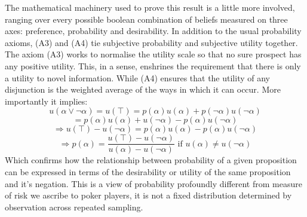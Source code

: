 \documentclass{tufte-handout}
\begin{document}
The mathematical machinery used to prove this result is a little more involved, ranging over every possible boolean combination of beliefs measured on three axes: preference, probability and desirability. In addition to the usual probability axioms, (A3) and (A4) tie subjective probability and subjective utility together. The axiom (A3) works to normalise the utility scale so that no sure prospect has any positive utility. This, in a sense, enshrines the requirement that there is only a utility to novel information. While (A4) ensures that the utility of any disjunction is the weighted average of the ways in which it can occur. More importantly it implies:
 $$u(\alpha \vee \neg\alpha) = u(\top) = p(\alpha)u(\alpha) + p(\neg\alpha)u(\neg\alpha)$$  
 $$= p(\alpha)u(\alpha) + u(\neg\alpha) - p(\alpha)u(\neg\alpha) $$
 $$ \Rightarrow u(\top) - u(\neg\alpha) = p(\alpha)u(\alpha)  - p(\alpha)u(\neg\alpha)$$
 $$ \Rightarrow p(\alpha) = \frac{u(\top) - u(\neg\alpha)}{ u(\alpha)  - u(\neg\alpha)} \text{  if } u(\alpha) \neq u(\neg\alpha) $$ 
Which confirms how the relationship between probability of a given proposition can be expressed in terms of the desirability or utility of the same proposition and it's negation. This is a view of probability profoundly different from measure of risk we ascribe to poker players, it is not a fixed distribution determined by observation across repeated sampling. 




\end{document}
